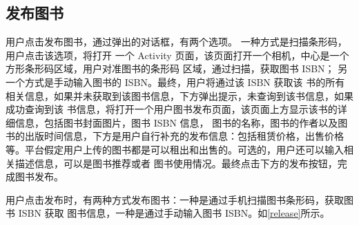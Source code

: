 \subsection{发布图书}
用户点击发布图书，通过弹出的对话框，有两个选项。
一种方式是扫描条形码，用户点击该选项，将打开
一个 Activity 页面，该页面打开一个相机，中心是一个方形条形码区域，用户对准图书的条形码
区域，通过扫描，获取图书 ISBN；
另一个方式是手动输入图书的 ISBN。最终，用户将通过该 ISBN 获取该
书的所有相关信息，如果并未获取到该图书信息，下方弹出提示，未查询到该书信息，如果成功查询到该
书信息，将打开一个用户图书发布页面，该页面上方显示该书的详细信息，包括图书封面图片，图书 ISBN 信息，
图书的名称，图书的作者以及图书的出版时间信息，下方是用户自行补充的发布信息：包括租赁价格，出售价格
等。平台假定用户上传的图书都是可以租出和出售的。可选的，用户还可以输入相关描述信息，可以是图书推荐或者
图书使用情况。最终点击下方的发布按钮，完成图书发布。

用户点击发布时，有两种方式发布图书：一种是通过手机扫描图书条形码，获取图书 ISBN 获取
图书信息，一种是通过手动输入图书 ISBN。如\cref{release}所示。

